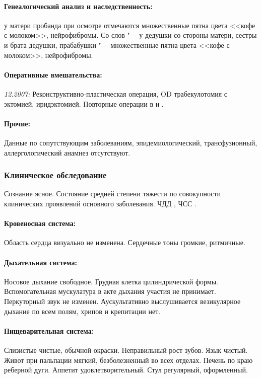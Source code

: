 \documentclass[a4paper,14pt]{extarticle}
\newcommand{\bpm}{уд/мин}
\newcommand{\mpm}{/мин}
\newcommand{\pdate}[1]{\emph{#1:} }
\begin{document}
\paragraph{Генеалогический анализ и наследственность:} у матери пробанда при осмотре отмечаются множественные пятна цвета <<кофе с молоком>>, нейрофибромы. Со слов "--- у дедушки со стороны матери, сестры и брата дедушки, прабабушки "--- множественные пятна цвета <<кофе с молоком>>, нейрофибромы.

\paragraph{Оперативные вмешательства:} \pdate{12.2007} Реконструктивно-пластическая операция, OD трабекулотомия с эктомией, иридэктомией. Повторные операции в  и .

\paragraph{Прочие:} Данные по сопутствующим заболеваниям, эпидемиологический, трансфузионный, аллергологический анамнез отсутствуют.

\subsubsection*{Клиническое обследование}

Сознание ясное.
Состояние средней степени тяжести по совокупности клинических проявлений основного заболевания.
ЧДД \numprint[\mpm]{26}, ЧСС \numprint[\bpm]{82}.

\paragraph{Кровеносная система:} Область сердца визуально не изменена. Сердечные тоны громкие, ритмичные. 

\paragraph{Дыхательная система:} Носовое дыхание свободное. Грудная клетка цилиндрической формы. Вспомогательная мускулатура в акте дыхания участия не принимает. Перкуторный звук не изменен. Аускультативно выслушивается везикулярное дыхание по всем полям, хрипов и крепитации нет.

\paragraph{Пищеварительная система:} Слизистые чистые, обычной окраски. Неправильный рост зубов. Язык чистый. Живот при пальпации мягкий, безболезненный во всех отделах. Печень по краю реберной дуги. Аппетит удовлетворительный. Стул регулярный, оформленный.
\end{document}
